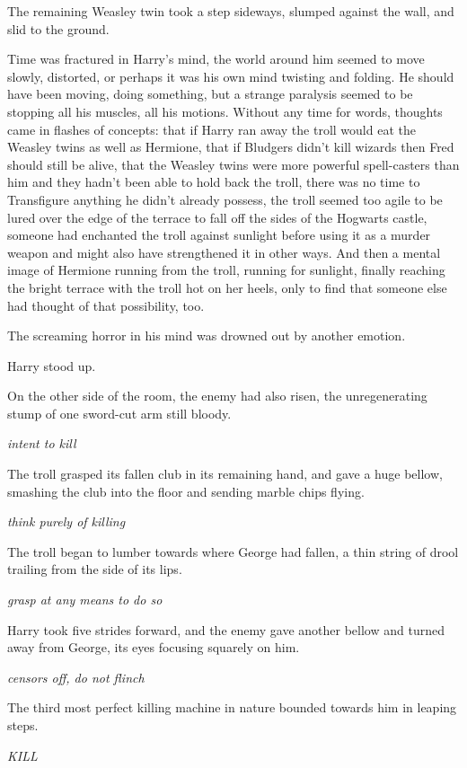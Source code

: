 The remaining Weasley twin took a step sideways, slumped against the wall, and slid to the ground.

Time was fractured in Harry's mind, the world around him seemed to move slowly, distorted, or perhaps it was his own mind twisting and folding. He should have been moving, doing something, but a strange paralysis seemed to be stopping all his muscles, all his motions. Without any time for words, thoughts came in flashes of concepts: that if Harry ran away the troll would eat the Weasley twins as well as Hermione, that if Bludgers didn't kill wizards then Fred should still be alive, that the Weasley twins were more powerful spell-casters than him and they hadn't been able to hold back the troll, there was no time to Transfigure anything he didn't already possess, the troll seemed too agile to be lured over the edge of the terrace to fall off the sides of the Hogwarts castle, someone had enchanted the troll against sunlight before using it as a murder weapon and might also have strengthened it in other ways. And then a mental image of Hermione running from the troll, running for sunlight, finally reaching the bright terrace with the troll hot on her heels, only to find that someone else had thought of that possibility, too.

The screaming horror in his mind was drowned out by another emotion.

Harry stood up.

On the other side of the room, the enemy had also risen, the unregenerating stump of one sword-cut arm still bloody.

\emph{intent to kill}

The troll grasped its fallen club in its remaining hand, and gave a huge bellow, smashing the club into the floor and sending marble chips flying.

\emph{think purely of killing}

The troll began to lumber towards where George had fallen, a thin string of drool trailing from the side of its lips.

\emph{grasp at any means to do so}

Harry took five strides forward, and the enemy gave another bellow and turned away from George, its eyes focusing squarely on him.

\emph{censors off, do not flinch}

The third most perfect killing machine in nature bounded towards him in leaping steps.

\emph{KILL}

